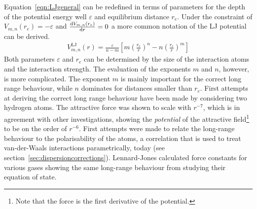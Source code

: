Equation~\ref{eqn:LJgeneral} can be redefined in terms of parameters for the
depth of the potential energy well $\varepsilon$ and equilibrium distance
$r_e$. Under the constraint of $V_{m,n}(r_e)=-\varepsilon$ and
$\dv{V_{m,n}(r_e)}{r}=0$ a more common notation of the \ac{LJ} potential can be
derived.
%
\begin{align}
    V_{m,n}^\text{LJ}(r)=\frac{\varepsilon}{n-m} \left[ m \left(\frac{r_e}{r}\right)^n  - n\left(\frac{r_e}{r}\right)^m \right]\label{eqn:LJgeneral_theory}
\end{align}
%
Both parameters $\varepsilon$ and $r_e$ can be determined by the size of the
interaction atoms and the interaction strength. The evaluation of the exponents
$m$ and $n$, however, is more complicated. The exponent $m$ is mainly important
for the correct long range behaviour, while $n$ dominates for distances smaller
than $r_e$. First attempts at deriving the correct long range behaviour have
been made by considering two hydrogen
atoms.\autocite{Wang_gegenseitigeEinwirkungzweier_1927} The attractive force was
shown to scale with $r^{-7}$, which is in agreement with other investigations,
showing the \textit{potential} of the attractive field\footnote{Note that the
force is the first derivative of the potential.} to be on the order of
$r^{-6}$.\autocite{Eisenschitz_UeberVerhaeltnisvan_1930,Lennard-Jones_Perturbationproblemsquantum_1930,Hasse_calculationvanWaal_1931,Slater_VanWaalsForces_1931}
First attempts were made to relate the long-range behaviour to the
polarisability of the
atoms,\autocite{London_ZurTheorieund_1930,Slater_VanWaalsForces_1931} a
correlation that is used to treat van-der-Waals interactions parametrically,
today (see section~\ref{sec:dispersioncorrections}). Lennard-Jones calculated
force constants for various gases showing the same long-range behaviour from
studying their equation of
state.\autocite{Jones_DeterminationMolecularFields_1924,Jones_atomicfieldshelium_1925,Lennard-Jones_theoreticalcalculationsphysical_1925,Lennard-Jones_molecularfieldshydrogen_1926,Lennard-Jones_equationstategaseous_1927}

